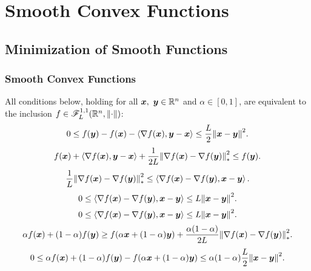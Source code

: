 \chapter{Smooth Convex Functions}\label{chap:smooth_convex_opt}

\newpage
\section{Minimization of Smooth Functions}\label{sec:min_smooth_funcs}

\subsection{Smooth Convex Functions}\label{subsec:smooth_convex_funcs}

\begin{thm}\label{thm:convex_funcs_thm}
    All conditions below, holding for all \(\bm{x},~\bm{y} \in \mathbb{R}^n\) and \(\alpha \in [0, 1]\),
    are equivalent to the inclusion \(f \in \mathscr{F}_{L}^{1,1}(\mathbb{R}^n, \norm{\cdot})\):
    \begin{equation}\label{eq:convex_func1}
        0 \le f(\bm{y}) - f(\bm{x}) - \left\langle \nabla f(\bm{x}), \bm{y} - \bm{x} \right\rangle \le  \frac{L}{2} \norm{\bm{x} - \bm{y}}^2.
    \end{equation}
    \begin{equation}\label{eq:convex_func2}
        f(\bm{x}) + \left\langle \nabla f(\bm{x}), \bm{y} - \bm{x} \right\rangle + \frac{1}{2L}\norm{\nabla f(\bm{x}) - \nabla f(\bm{y})}^2_* \le f(\bm{y}).
    \end{equation}
    \begin{equation}\label{eq:convex_func3}
        \frac{1}{L}\norm{\nabla f(\bm{x}) - \nabla f(\bm{y})}^2_* \le \left\langle \nabla f(\bm{x}) - \nabla f(\bm{y}), \bm{x} - \bm{y} \right\rangle.
    \end{equation}
    \begin{equation}\label{eq:convex_func4}
        0 \le \left\langle \nabla f(\bm{x}) - \nabla f(\bm{y}), \bm{x} - \bm{y} \right\rangle \le L\norm{\bm{x} - \bm{y}}^2.
    \end{equation}
    \begin{equation}\label{eq:convex_func5}
        0 \le \left\langle \nabla f(\bm{x}) - \nabla f(\bm{y}), \bm{x} - \bm{y} \right\rangle \le L\norm{\bm{x} - \bm{y}}^2.
    \end{equation}
    \begin{equation}\label{eq:convex_func6}
        \alpha f(\bm{x}) + (1 - \alpha) f(\bm{y}) \ge f(\alpha \bm{x} + (1 - \alpha) \bm{y}) + \frac{\alpha(1 - \alpha)}{2L} \norm{\nabla f(\bm{x}) - \nabla f(\bm{y})}^2_*.
    \end{equation}
    \begin{equation}\label{eq:convex_func7}
        0 \le \alpha f(\bm{x}) + (1 - \alpha) f(\bm{y}) - f(\alpha \bm{x} + (1 - \alpha) \bm{y}) \le \alpha (1 - \alpha) \frac{L}{2} \norm{\bm{x} - \bm{y}}^2.
    \end{equation}
\end{thm}